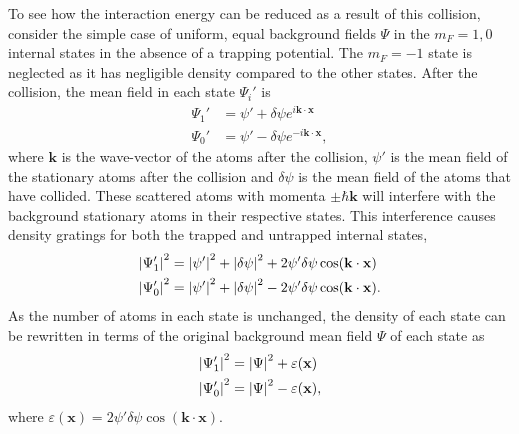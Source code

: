 To see how the interaction energy can be reduced as a result of this collision, consider the simple case of uniform, equal background fields $\Psi$ in the $m_F=1, 0$ internal states in the absence of a trapping potential. The $m_F=-1$ state is neglected as it has negligible density compared to the other states. After the collision, the mean field in each state $\Psi_i'$ is
\begin{align}
    \Psi_1' &= \psi' + \delta \psi e^{i \mathbf{k} \cdot \mathbf{x}}   \label{Peaks:MFCollisionT}\\
    \Psi_0' &= \psi' - \delta \psi e^{-i \mathbf{k} \cdot \mathbf{x}}, \label{Peaks:MFCollisionU}
\end{align}
where $\mathbf{k}$ is the wave-vector of the atoms after the collision, $\psi'$ is the mean field of the stationary atoms after the collision and $\delta \psi$ is the mean field of the atoms that have collided. These scattered atoms with momenta $\pm \hbar \mathbf{k}$ will interfere with the background stationary atoms in their respective states. This interference causes density gratings for both the trapped and untrapped internal states,
\begin{align}
    \left|\Psi_1'\right|^2 &= \left|\psi'\right|^2 + \left|\delta \psi\right|^2 + 2 \psi'\delta\psi \cos (\mathbf{k}\cdot \mathbf{x})\\
    \left|\Psi_0'\right|^2 &= \left|\psi'\right|^2 + \left|\delta \psi\right|^2 - 2 \psi'\delta\psi \cos (\mathbf{k}\cdot \mathbf{x}).
\end{align}
As the number of atoms in each state is unchanged, the density of each state can be rewritten in terms of the original background mean field $\Psi$ of each state as
\begin{align}
    \left|\Psi_1'\right|^2 &= \left|\Psi\right|^2 + \varepsilon(\mathbf{x})\\
    \left|\Psi_0'\right|^2 &= \left|\Psi\right|^2 - \varepsilon(\mathbf{x}),
\end{align}
where $\varepsilon(\mathbf{x}) = 2 \psi' \delta\psi \cos (\mathbf{k}\cdot\mathbf{x})$. 

